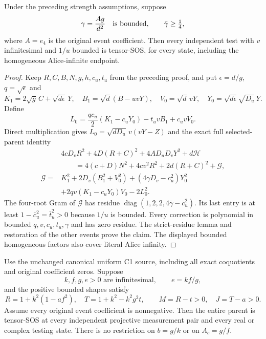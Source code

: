 \begin{lemma}
Under the preceding strength assumptions, suppose
\[
 \gamma=\frac{A g}{d^2}\quad\hbox{is bounded},\qquad \bar\gamma\geq\tfrac14,
\]
where $A=e_4$ is the original event coefficient. Then every independent
test with $v$ infinitesimal and $1/u$ bounded is tensor-SOS, for every
state, including the homogeneous Alice-infinite endpoint.
\end{lemma}
\begin{proof}
Keep $R,C,B,N,g,h,c_u,t_u$ from the preceding proof, and put
$\epsilon=d/g$, $q=\sqrt\epsilon$ and
\[
 K_1=2\sqrt g\,C+\sqrt{d\epsilon}\,Y,\quad
 B_1=\sqrt d(B-uvY),\quad V_0=\sqrt d\,vY,
 \quad Y_0=\sqrt{d\epsilon}\sqrt{D_u}\,Y.
\]
Define
\[
 L_0=\frac{qc_u}{2}(K_1-c_uY_0)-t_uvB_1+c_uvV_0.
\]
Direct multiplication gives $L_0=\sqrt{dD_u}\,v(vY-Z)$ and the exact
full selected-parent identity
\[
\begin{split}
&4cD_vR^2+4D(R+C)^2+4AD_uD_vY^2+d\mathcal H\\
&\qquad=4(c+D)N^2+4cv^2R^2+2d(R+C)^2+\mathcal G,\\
\mathcal G={}&K_1^2+2D_v(B_1^2+V_0^2)
 +(4\gamma D_v-c_u^2)Y_0^2\\
&+2qv(K_1-c_uY_0)V_0-2L_0^2.
\end{split}
\]
The four-root Gram of $\mathcal G$ has residue
$\operatorname{diag}(1,2,2,4\bar\gamma-\bar c_u^2)$.
Its last entry is at least $1-\bar c_u^2=\bar t_u^2>0$ because $1/u$
is bounded. Every correction is polynomial in bounded
$q,v,c_u,t_u,\gamma$ and has zero residue. The strict-residue lemma and
restoration of the other events prove the claim. The displayed bounded
homogeneous factors also cover literal Alice infinity.
\end{proof}

\begin{theorem}
\label{thm:c1-uniform-all-tests}
Use the unchanged canonical uniform C1 source, including all exact
coquotients and original coefficient zeros. Suppose
\[
 k,f,g,e>0\text{ are infinitesimal},\qquad e=kf/g,
\]
and the positive bounded shapes satisfy
\[
 R=1+k^2(1-af^2),\quad T=1+k^2-k^2g^2t,\qquad
 M=R-t>0,\quad J=T-a>0.
\]
Assume every original event coefficient is nonnegative. Then the entire
parent is tensor-SOS at every independent projective measurement pair
and every real or complex testing state. There is no restriction on
$b=g/k$ or on $A_c=g/f$.
\end{theorem}

